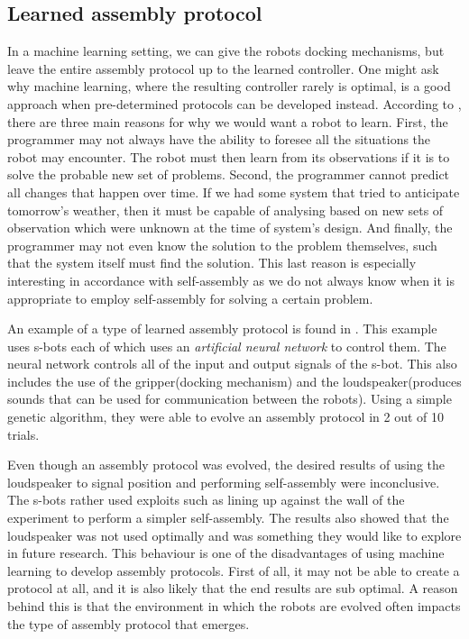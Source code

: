 \subsection{Learned assembly protocol}
In a machine learning setting, we can give the robots docking mechanisms, but leave the entire assembly protocol up to the learned controller.
One might ask why machine learning, where the resulting controller rarely is optimal, is a good approach when pre-determined protocols can be developed instead.
According to \cite{russell_artificial_1995}, there are three main reasons for why we would want a robot to learn.
First, the programmer may not always have the ability to foresee all the situations the robot may encounter.
The robot must then learn from its observations if it is to solve the probable new set of problems.
Second, the programmer cannot predict all changes that happen over time. 
If we had some system that tried to anticipate tomorrow's weather, then it must be capable of analysing based on new sets of observation which were unknown at the time of system's design.
And finally, the programmer may not even know the solution to the problem themselves, such that the system itself must find the solution.
This last reason is especially interesting in accordance with self-assembly as we do not always know when it is appropriate to employ self-assembly for solving a certain problem.

An example of a type of learned assembly protocol is found in \cite{trianni_evolving_2004}. 
This example uses s-bots each of which uses an \emph{artificial neural network} to control them. 
The neural network controls all of the input and output signals of the s-bot.
This also includes the use of the gripper(docking mechanism) and the loudspeaker(produces sounds that can be used for communication between the robots).
Using a simple genetic algorithm, they were able to evolve an assembly protocol in 2 out of 10 trials.

Even though an assembly protocol was evolved, the desired results of using the loudspeaker to signal position and performing self-assembly were inconclusive.
The s-bots rather used exploits such as lining up against the wall of the experiment to perform a simpler self-assembly.
The results also showed that the loudspeaker was not used optimally and was something they would like to explore in future research.
This behaviour is one of the disadvantages of using machine learning to develop assembly protocols.
First of all, it may not be able to create a protocol at all, and it is also likely that the end results are sub optimal. 
A reason behind this is that the environment in which the robots are evolved often impacts the type of assembly protocol that emerges.

